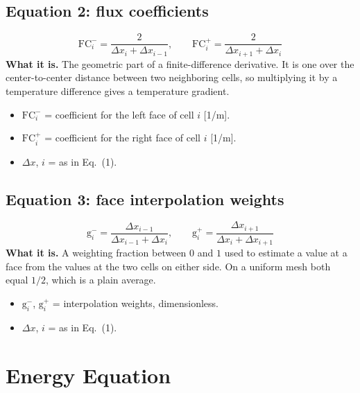 \documentclass[11pt]{article}
\begin{document}
\subsection*{Equation 2: flux coefficients}
\begin{equation}
\mathrm{FC}^-_i = \frac{2}{\Delta x_i + \Delta x_{i-1}}, \qquad
\mathrm{FC}^+_i = \frac{2}{\Delta x_{i+1} + \Delta x_i}
\end{equation}
\textbf{What it is.} The geometric part of a finite-difference derivative. It is
one over the center-to-center distance between two neighboring cells, so
multiplying it by a temperature difference gives a temperature gradient.
\begin{itemize}
  \item $\mathrm{FC}^-_i$ = coefficient for the left face of cell $i$ [1/m].
  \item $\mathrm{FC}^+_i$ = coefficient for the right face of cell $i$ [1/m].
  \item $\Delta x$, $i$ = as in Eq.~(1).
\end{itemize}

\subsection*{Equation 3: face interpolation weights}
\begin{equation}
\mathrm{g}^-_i = \frac{\Delta x_{i-1}}{\Delta x_{i-1} + \Delta x_i}, \qquad
\mathrm{g}^+_i = \frac{\Delta x_{i+1}}{\Delta x_i + \Delta x_{i+1}}
\end{equation}
\textbf{What it is.} A weighting fraction between $0$ and $1$ used to estimate a
value at a face from the values at the two cells on either side. On a uniform
mesh both equal $1/2$, which is a plain average.
\begin{itemize}
  \item $\mathrm{g}^-_i$, $\mathrm{g}^+_i$ = interpolation weights, dimensionless.
  \item $\Delta x$, $i$ = as in Eq.~(1).
\end{itemize}

\section{Energy Equation}
\end{document}
